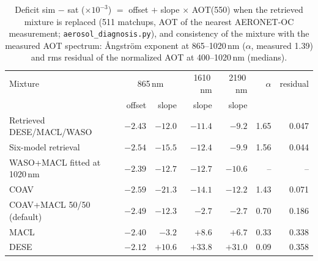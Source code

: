 \documentclass[11pt,a4paper]{article}
\newcommand{\code}[1]{\texttt{#1}}
\begin{document}
\begin{table}[h]
\centering\small
\caption{Deficit sim $-$ sat ($\times10^{-3}$) $=$ offset $+$ slope $\times$ AOT(550) when the retrieved mixture is
replaced (511 matchups, AOT of the nearest AERONET-OC measurement; \code{aerosol\_diagnosis.py}), and consistency of
the mixture with the measured AOT spectrum: Ångström exponent at 865--1020\,nm ($\alpha$, measured 1.39) and rms
residual of the normalized AOT at 400--1020\,nm (medians).}
\label{tab:aerosol}
\begin{tabular}{lrrrrrr}
\toprule
Mixture & \multicolumn{2}{c}{865\,nm} & 1610\,nm & 2190\,nm & $\alpha$ & residual \\
 & offset & slope & slope & slope & & \\
\midrule
Retrieved DESE/MACL/WASO & $-2.43$ & $-12.0$ & $-11.4$ & $-9.2$ & 1.65 & 0.047 \\
Six-model retrieval      & $-2.54$ & $-15.5$ & $-12.4$ & $-9.9$ & 1.56 & 0.044 \\
WASO+MACL fitted at 1020\,nm & $-2.39$ & $-12.7$ & $-12.7$ & $-10.6$ & -- & -- \\
COAV                     & $-2.59$ & $-21.3$ & $-14.1$ & $-12.2$ & 1.43 & 0.071 \\
COAV+MACL 50/50 (default) & $-2.49$ & $-12.3$ & $-2.7$ & $-2.7$ & 0.70 & 0.186 \\
MACL                     & $-2.40$ & $-3.2$ & $+8.6$ & $+6.7$ & 0.33 & 0.338 \\
DESE                     & $-2.12$ & $+10.6$ & $+33.8$ & $+31.0$ & 0.09 & 0.358 \\
\bottomrule
\end{tabular}
\end{table}
\end{document}

